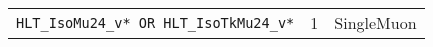 \begin{table}[h]
\begin{tabular}{|lll|}
            \texttt{HLT\_IsoMu24\_v* OR HLT\_IsoTkMu24\_v*} & 1 & SingleMuon \\                         %

\end{tabular}
\end{table}
